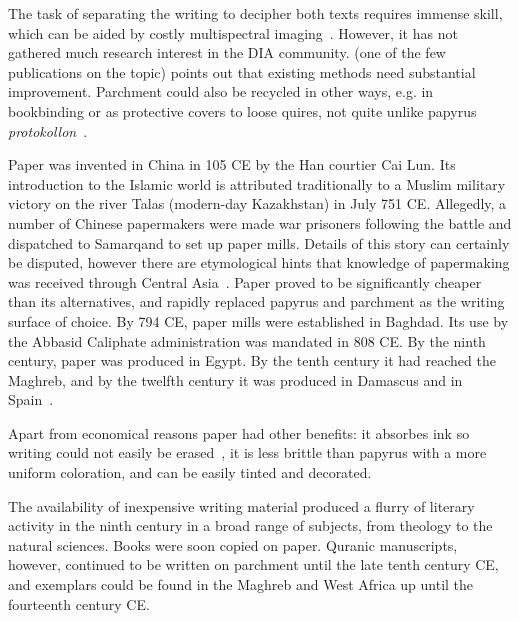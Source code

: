 The task of separating the writing to decipher both texts requires immense
skill, which can be aided by costly multispectral
imaging~\cite{easton2003multispectral}. However, it has not gathered much
research interest in the DIA community. \cite{starynska2017methods} (one of the
few publications on the topic) points out that existing methods need
substantial improvement. Parchment could also be recycled in other ways, e.g.
in bookbinding or as protective covers to loose quires, not quite unlike
papyrus \emph{protokollon}~\cite[pg. 46]{deroche2006islamic}.

Paper was invented in China in 105 CE by the Han courtier Cai Lun. Its
introduction to the Islamic world is attributed traditionally to a Muslim
military victory on the river Talas (modern-day Kazakhstan) in July 751 CE.
Allegedly, a number of Chinese papermakers were made war prisoners following
the battle and dispatched to Samarqand to set up paper mills. Details of this
story can certainly be disputed, however there are etymological hints that
knowledge of papermaking was received through Central Asia~\cite[pg.
45]{blair2006islamic}. Paper proved to be significantly cheaper than its
alternatives, and rapidly replaced papyrus and parchment as the writing surface
of choice. By 794 CE, paper mills were established in Baghdad. Its use by the
Abbasid Caliphate administration was mandated in 808 CE. By the ninth century,
paper was produced in Egypt. By the tenth century it had reached the Maghreb,
and by the twelfth century it was produced in Damascus and in Spain~\cite[pg.
51]{deroche2006islamic}.

Apart from economical reasons paper had other benefits: it absorbes ink so
writing could not easily be erased~\cite[pg. 45]{blair2006islamic}, it is less
brittle than papyrus with a more uniform coloration, and can be easily tinted
and decorated.

The availability of inexpensive writing material produced a flurry of literary
activity in the ninth century in a broad range of subjects, from theology to
the natural sciences. Books were soon copied on paper. Quranic manuscripts,
however, continued to be written on parchment until the late tenth century CE,
and exemplars could be found in the Maghreb and West Africa up until the
fourteenth century CE.

